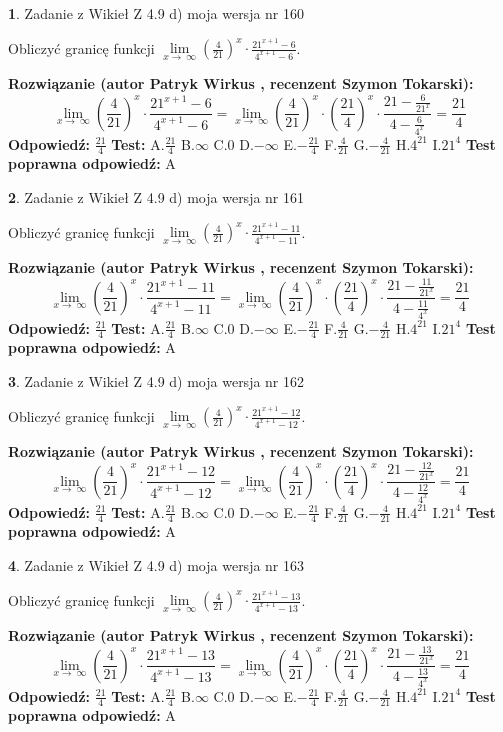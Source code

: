 \documentclass[12pt, a4paper]{article}
\theoremstyle{definition} %
\newtheorem{zad}{}
\newcommand{\zadStart}[1]{\begin{zad}#1\newline}
\newcommand{\zadStop}{\end{zad}}
\newcommand{\rozwStart}[2]{\noindent \textbf{Rozwiązanie (autor #1 , recenzent #2): }\newline}
\newcommand{\rozwStop}{\newline}
\newcommand{\odpStart}{\noindent \textbf{Odpowiedź:}\newline}
\newcommand{\odpStop}{\newline}
\newcommand{\testStart}{\noindent \textbf{Test:}\newline}
\newcommand{\testStop}{\newline}
\newcommand{\kluczStart}{\noindent \textbf{Test poprawna odpowiedź:}\newline}
\newcommand{\kluczStop}{\newline}
\begin{document}
\zadStart{Zadanie z Wikieł Z 4.9 d) moja wersja nr 160}


Obliczyć granicę funkcji  $\lim\limits_{x\to\ \infty}(\frac{4}{21})^{x}\cdot\frac{21^{x+1}-6}{4^{x+1}-6}$.
\zadStop
\rozwStart{Patryk Wirkus}{Szymon Tokarski}
$$\lim\limits_{x\to\ \infty}(\frac{4}{21})^{x}\cdot\frac{21^{x+1}-6}{4^{x+1}-6}=\lim\limits_{x\to\ \infty}(\frac{4}{21})^{x}\cdot(\frac{21}{4})^{x} \cdot \frac{21-\frac{6}{21^{x}}}{4-\frac{6}{4^{x}}} = \frac{21}{4}$$
\rozwStop
\odpStart
$\frac{21}{4}$
\odpStop
\testStart
A.$\frac{21}{4}$ B.$\infty$ C.$0$ D.$-\infty$ E.$-\frac{21}{4}$
F.$\frac{4}{21}$ G.$-\frac{4}{21}$
H.$4^{21}$
I.$21^{4}$
\testStop
\kluczStart
A
\kluczStop



\zadStart{Zadanie z Wikieł Z 4.9 d) moja wersja nr 161}


Obliczyć granicę funkcji  $\lim\limits_{x\to\ \infty}(\frac{4}{21})^{x}\cdot\frac{21^{x+1}-11}{4^{x+1}-11}$.
\zadStop
\rozwStart{Patryk Wirkus}{Szymon Tokarski}
$$\lim\limits_{x\to\ \infty}(\frac{4}{21})^{x}\cdot\frac{21^{x+1}-11}{4^{x+1}-11}=\lim\limits_{x\to\ \infty}(\frac{4}{21})^{x}\cdot(\frac{21}{4})^{x} \cdot \frac{21-\frac{11}{21^{x}}}{4-\frac{11}{4^{x}}} = \frac{21}{4}$$
\rozwStop
\odpStart
$\frac{21}{4}$
\odpStop
\testStart
A.$\frac{21}{4}$ B.$\infty$ C.$0$ D.$-\infty$ E.$-\frac{21}{4}$
F.$\frac{4}{21}$ G.$-\frac{4}{21}$
H.$4^{21}$
I.$21^{4}$
\testStop
\kluczStart
A
\kluczStop



\zadStart{Zadanie z Wikieł Z 4.9 d) moja wersja nr 162}


Obliczyć granicę funkcji  $\lim\limits_{x\to\ \infty}(\frac{4}{21})^{x}\cdot\frac{21^{x+1}-12}{4^{x+1}-12}$.
\zadStop
\rozwStart{Patryk Wirkus}{Szymon Tokarski}
$$\lim\limits_{x\to\ \infty}(\frac{4}{21})^{x}\cdot\frac{21^{x+1}-12}{4^{x+1}-12}=\lim\limits_{x\to\ \infty}(\frac{4}{21})^{x}\cdot(\frac{21}{4})^{x} \cdot \frac{21-\frac{12}{21^{x}}}{4-\frac{12}{4^{x}}} = \frac{21}{4}$$
\rozwStop
\odpStart
$\frac{21}{4}$
\odpStop
\testStart
A.$\frac{21}{4}$ B.$\infty$ C.$0$ D.$-\infty$ E.$-\frac{21}{4}$
F.$\frac{4}{21}$ G.$-\frac{4}{21}$
H.$4^{21}$
I.$21^{4}$
\testStop
\kluczStart
A
\kluczStop



\zadStart{Zadanie z Wikieł Z 4.9 d) moja wersja nr 163}


Obliczyć granicę funkcji  $\lim\limits_{x\to\ \infty}(\frac{4}{21})^{x}\cdot\frac{21^{x+1}-13}{4^{x+1}-13}$.
\zadStop
\rozwStart{Patryk Wirkus}{Szymon Tokarski}
$$\lim\limits_{x\to\ \infty}(\frac{4}{21})^{x}\cdot\frac{21^{x+1}-13}{4^{x+1}-13}=\lim\limits_{x\to\ \infty}(\frac{4}{21})^{x}\cdot(\frac{21}{4})^{x} \cdot \frac{21-\frac{13}{21^{x}}}{4-\frac{13}{4^{x}}} = \frac{21}{4}$$
\rozwStop
\odpStart
$\frac{21}{4}$
\odpStop
\testStart
A.$\frac{21}{4}$ B.$\infty$ C.$0$ D.$-\infty$ E.$-\frac{21}{4}$
F.$\frac{4}{21}$ G.$-\frac{4}{21}$
H.$4^{21}$
I.$21^{4}$
\testStop
\kluczStart
A
\kluczStop
\end{document}
